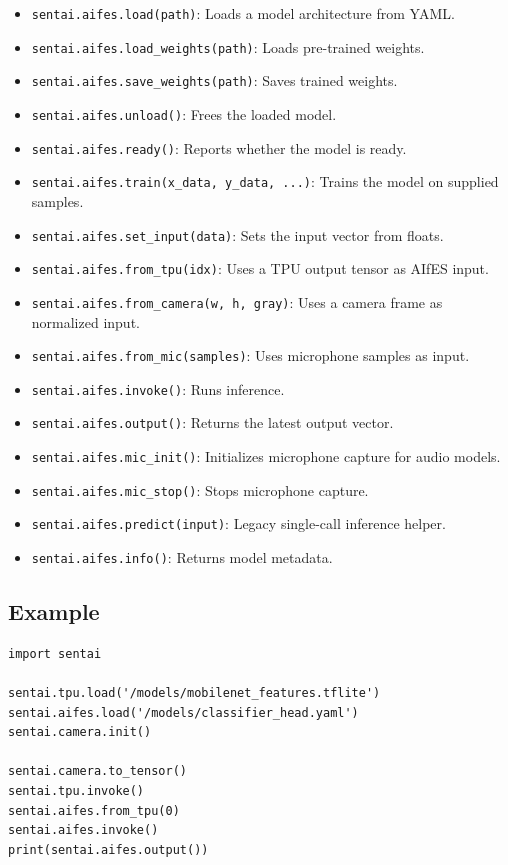 \begin{itemize}
\tightlist
\item
  \texttt{sentai.aifes.load(path)}: Loads a model architecture from
  YAML.
\item
  \texttt{sentai.aifes.load\_weights(path)}: Loads pre-trained weights.
\item
  \texttt{sentai.aifes.save\_weights(path)}: Saves trained weights.
\item
  \texttt{sentai.aifes.unload()}: Frees the loaded model.
\item
  \texttt{sentai.aifes.ready()}: Reports whether the model is ready.
\item
  \texttt{sentai.aifes.train(x\_data,\ y\_data,\ ...)}: Trains the model
  on supplied samples.
\item
  \texttt{sentai.aifes.set\_input(data)}: Sets the input vector from
  floats.
\item
  \texttt{sentai.aifes.from\_tpu(idx)}: Uses a TPU output tensor as
  AIfES input.
\item
  \texttt{sentai.aifes.from\_camera(w,\ h,\ gray)}: Uses a camera frame
  as normalized input.
\item
  \texttt{sentai.aifes.from\_mic(samples)}: Uses microphone samples as
  input.
\item
  \texttt{sentai.aifes.invoke()}: Runs inference.
\item
  \texttt{sentai.aifes.output()}: Returns the latest output vector.
\item
  \texttt{sentai.aifes.mic\_init()}: Initializes microphone capture for
  audio models.
\item
  \texttt{sentai.aifes.mic\_stop()}: Stops microphone capture.
\item
  \texttt{sentai.aifes.predict(input)}: Legacy single-call inference
  helper.
\item
  \texttt{sentai.aifes.info()}: Returns model metadata.
\end{itemize}

\subsection{Example}\label{example-15}

\begin{verbatim}
import sentai

sentai.tpu.load('/models/mobilenet_features.tflite')
sentai.aifes.load('/models/classifier_head.yaml')
sentai.camera.init()

sentai.camera.to_tensor()
sentai.tpu.invoke()
sentai.aifes.from_tpu(0)
sentai.aifes.invoke()
print(sentai.aifes.output())
\end{verbatim}

